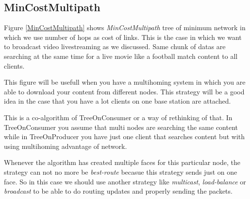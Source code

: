 \subsection{MinCostMultipath}
Figure \ref{MinCostMultipath} shows \textit{MinCostMultipath} tree of minimum network in which we use number of hops as cost of links. This is the case in which we want to broadcast video livestreaming as we discussed. Same chunk of datas are searching at the same time for a live movie like a football match content to all clients.


This figure will be usefull when you have a multihoming system in which you are able to download your content from different nodes. This strategy will be a good idea in the case that you have a lot clients on one base station are attached.

This is a co-algorithm of TreeOnConsumer or a way of rethinking of that. In TreeOnConsumer you assume that multi nodes are searching the same content while in TreeOnProducer you have just one client that searches content but with using multihoming advantage of network. 

Whenever the algorithm has created multiple faces for this particular node, the strategy can not no more be \textit{best-route} becasue this strategy sends just on one face. So in this case we should use another strategy like \textit{multicast}, \textit{load-balance} or \textit{broadcast} to be able to do routing updates and properly sending the packets.
 
